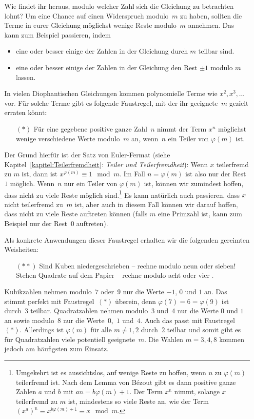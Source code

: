 Wie findet ihr heraus, modulo welcher Zahl sich die Gleichung zu betrachten lohnt? Um eine Chance auf einen Widerspruch modulo~$m$ zu haben, sollten die Terme in eurer Gleichung möglichst wenige Reste modulo~$m$ annehmen. Das kann zum Beispiel passieren, indem
\begin{itemize}
	\item eine oder besser einige der Zahlen in der Gleichung durch $m$ teilbar sind.
	\item eine oder besser einige der Zahlen in der Gleichung den Rest $\pm1$ modulo $m$ lassen.
\end{itemize}
In vielen Diophantischen Gleichungen kommen polynomielle Terme wie $x^2,x^3,\dotsc$ vor. Für solche Terme gibt es folgende Faustregel, mit der ihr geeignete~$m$ gezielt erraten könnt:
\begin{itemize}\itshape
	\item[$(*)$] Für eine gegebene positive ganze Zahl~$n$ nimmt der Term $x^n$ möglichst wenige verschiedene Werte modulo~$m$ an, wenn~$n$ ein Teiler von $\varphi(m)$ ist.
\end{itemize}
Der Grund hierfür ist der Satz von Euler-Fermat (siehe Kapitel~\ref{kapitel:Teilerfremdheit}: \emph{Teiler und Teilerfremdheit}): Wenn $x$ teilerfremd zu $m$ ist, dann ist $x^{\varphi(m)}\equiv 1\mod m$. Im Fall $n=\varphi(m)$ ist also nur der Rest~$1$ möglich. Wenn~$n$ nur ein Teiler von $\varphi(m)$ ist, können wir zumindest hoffen, dass nicht zu viele Reste möglich sind.\footnote{Umgekehrt ist es aussichtslos, auf wenige Reste zu hoffen, wenn $n$ zu $\varphi(m)$ teilerfremd ist. Nach dem Lemma von Bézout gibt es dann positive ganze Zahlen $a$ und $b$ mit $an=b\varphi(m)+1$. Der Term $x^n$ nimmt, solange $x$ teilerfremd zu $m$ ist, mindestens so viele Reste an, wie der Term $(x^a)^n\equiv x^{b\varphi(m)+1}\equiv x\mod m$.} Es kann natürlich auch passieren, dass $x$ nicht teilerfremd zu~$m$ ist, aber auch in diesem Fall können wir darauf hoffen, dass nicht zu viele Reste auftreten können (falls $m$ eine Primzahl ist, kann zum Beispiel nur der Rest~$0$ auftreten).

Als konkrete Anwendungen dieser Faustregel erhalten wir die folgenden gereimten Weisheiten:
\begin{itemize}\itshape
	\item[$(**)$] Sind Kuben niedergeschrieben -- rechne modulo neun oder sieben!\\
	Stehen Quadrate auf dem Papier -- rechne modulo acht oder vier .
\end{itemize}
Kubikzahlen nehmen modulo~$7$ oder~$9$ nur die Werte $-1$, $0$ und $1$ an. Das stimmt perfekt mit Faustregel~$(*)$ überein, denn $\varphi(7)=6=\varphi(9)$ ist durch~$3$ teilbar. Quadratzahlen nehmen modulo~$3$ und~$4$ nur die Werte $0$ und $1$ an sowie modulo~$8$ nur die Werte~$0$,~$1$ und~$4$. Auch das passt mit Faustregel~$(*)$. Allerdings ist $\varphi(m)$ für alle $m\neq 1,2$ durch~$2$ teilbar und somit gibt es für Quadratzahlen viele potentiell geeignete~$m$. Die Wahlen $m=3,4,8$ kommen jedoch am häufigsten zum Einsatz.

